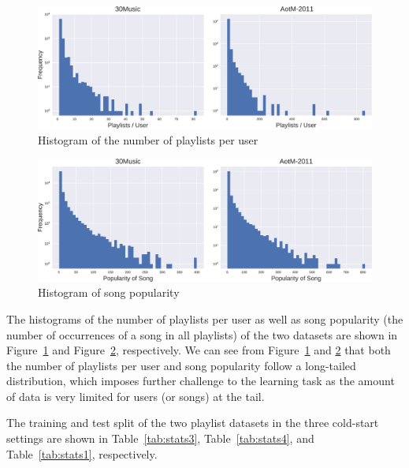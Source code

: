 %

\begin{figure}[!h]
    \centering
    \includegraphics[width=.98\columnwidth]{fig/hist_pluser.pdf}
    \caption{Histogram of the number of playlists per user}
    \label{fig:hist_pluser}
\end{figure}

\begin{figure}[!h]
    \centering
    \includegraphics[width=.98\columnwidth]{fig/hist_songpop.pdf}
    \caption{Histogram of song popularity}
    \label{fig:hist_songpop}
\end{figure}

The histograms of the number of playlists per user as well as song popularity 
(\ie the number of occurrences of a song in all playlists)
of the two datasets are shown in Figure~\ref{fig:hist_pluser} and Figure~\ref{fig:hist_songpop},
respectively.
We can see from Figure~\ref{fig:hist_pluser} and \ref{fig:hist_songpop} that both the number
of playlists per user and song popularity follow a long-tailed distribution, which imposes further challenge to the learning task 
as the amount of data is very limited for users (or songs) at the tail.

\newpage

The training and test split of the two playlist datasets in the three cold-start settings are shown in 
Table~\ref{tab:stats3}, Table~\ref{tab:stats4}, and Table~\ref{tab:stats1}, respectively.
%

